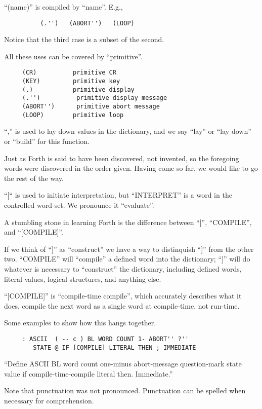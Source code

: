 ``(name)'' is compiled by ``name''.  E.g.,
\begin{verbatim}
          (.'')   (ABORT'')   (LOOP)
\end{verbatim}

Notice that the third case is a subset of the second.

All these uses can be covered by ``primitive''.
\begin{verbatim}
     (CR)          primitive CR
     (KEY)         primitive key
     (.)           primitive display
     (.'')          primitive display message
     (ABORT'')      primitive abort message
     (LOOP)        primitive loop
\end{verbatim}

``,''  is  used to lay down values in the dictionary, and we
say ``lay'' or ``lay down'' or ``build'' for this function.

Just  as  Forth  is  said  to  have  been  discovered, not
invented, so the foregoing words were discovered in  the  order
given.  Having come so far, we would like to go the rest of the
way.

``[`` is used to initiate interpretation, but ``INTERPRET'' is
a word in the controlled word-set.  We pronounce it ``evaluate''.

A stumbling stone in  learning  Forth  is  the  difference
between ``]'', ``COMPILE'', and ``[COMPILE]''.

If  we  think  of  ``]''  as  ``construct''  we  have a way to
distinquish ``]'' from the other two.  ``COMPILE'' will ``compile'' a
defined word into the dictionary;   ``]''  will  do  whatever  is
necessary  to  ``construct''  the  dictionary,  including defined
words, literal values, logical structures, and anything else.

``[COMPILE]''  is  ``compile-time  compile'',  which  accurately
describes  what it does, compile the next word as a single word
at compile-time, not run-time.

Some examples to show how this hangs together.

\begin{verbatim}
     : ASCII  ( -- c ) BL WORD COUNT 1- ABORT'' ?''
        STATE @ IF [COMPILE] LITERAL THEN ; IMMEDIATE
\end{verbatim}

``Define   ASCII  BL  word  count  one-minus  abort-message
question-mark  state   value   if  compile-time-compile literal
then.  Immediate.''

Note that punctuation  was  not  pronounced.   Punctuation
can be spelled when necessary for comprehension.

